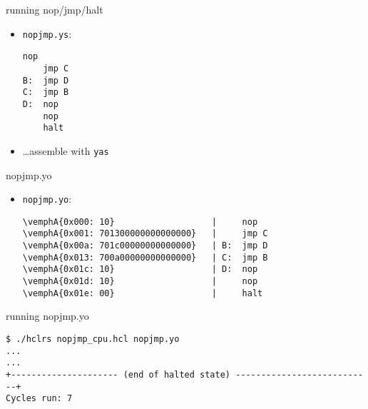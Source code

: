 \begin{frame}[fragile,label=hcl2DInteractiveA]{running nop/jmp/halt}
    \begin{itemize}
    \item {\tt nopjmp.ys}:
\begin{Verbatim}[fontsize=\small,commandchars=\\\{\}]
    nop
    jmp C
B:  jmp D
C:  jmp B
D:  nop
    nop
    halt
\end{Verbatim}
    \item \ldots assemble with {\tt yas}
\end{itemize}
\end{frame}

\begin{frame}[fragile,label=hcl2DInteractiveB]{nopjmp.yo}
\begin{itemize}
    \item {\tt nopjmp.yo}:
\begin{Verbatim}[fontsize=\small,commandchars=\\\{\}]
\vemphA{0x000: 10}                   |     nop
\vemphA{0x001: 701300000000000000}   |     jmp C
\vemphA{0x00a: 701c00000000000000}   | B:  jmp D
\vemphA{0x013: 700a00000000000000}   | C:  jmp B
\vemphA{0x01c: 10}                   | D:  nop
\vemphA{0x01d: 10}                   |     nop
\vemphA{0x01e: 00}                   |     halt
\end{Verbatim}
\end{itemize}
\end{frame}

\begin{frame}[fragile,label=runningNopJmp]{running nopjmp.yo}
\begin{Verbatim}[fontsize=\fontsize{8}{9}\selectfont]
$ ./hclrs nopjmp_cpu.hcl nopjmp.yo
...
...
+--------------------- (end of halted state) ---------------------------+
Cycles run: 7
\end{Verbatim}
\end{frame}

